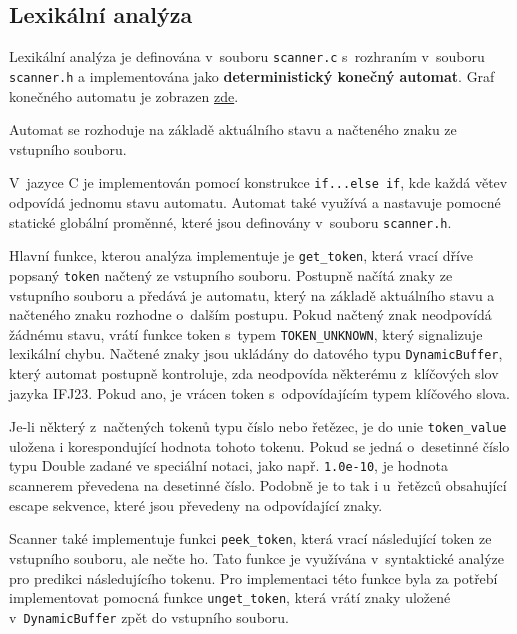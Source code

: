\documentclass[a4paper, 11pt]{article}
\begin{document}
	\subsection{Lexikální analýza} \label{sec:lex}
	Lexikální analýza je definována v~souboru \texttt{scanner.c} s~rozhraním v~souboru \texttt{scanner.h} a implementována jako \textbf{deterministický konečný automat}. Graf konečného automatu je zobrazen \hyperref[sec:fa]{zde}.
	\par\noindent Automat se rozhoduje na základě aktuálního stavu a načteného znaku ze vstupního souboru.
	\par\noindent V~jazyce C je implementován pomocí konstrukce \texttt{if...else if}, kde každá větev odpovídá jednomu stavu automatu. Automat také využívá a nastavuje pomocné statické globální proměnné, které jsou definovány v~souboru \texttt{scanner.h}. 
	\par\noindent Hlavní funkce, kterou analýza implementuje je \texttt{get\_token}, která vrací dříve popsaný \texttt{token} načtený ze vstupního souboru. Postupně načítá znaky ze vstupního souboru a předává je automatu, který na základě aktuálního stavu a načteného znaku rozhodne o~dalším postupu. Pokud načtený znak neodpovídá žádnému stavu, vrátí funkce token s~typem \texttt{TOKEN\_UNKNOWN}, který signalizuje lexikální chybu.
	Načtené znaky jsou ukládány do datového typu \texttt{DynamicBuffer}, který automat postupně kontroluje, zda neodpovída některému z~klíčových slov jazyka IFJ23. Pokud ano, je vrácen token s~odpovídajícím typem klíčového slova.
	\par\noindent Je-li některý z~načtených tokenů typu číslo nebo řetězec, je do unie \texttt{token\_value} uložena i korespondující hodnota tohoto tokenu. Pokud se jedná o~desetinné číslo typu Double zadané ve speciální notaci, jako např. \texttt{1.0e-10}, je hodnota scannerem převedena na desetinné číslo. Podobně je to tak i u~řetězců obsahující escape sekvence, které jsou převedeny na odpovídající znaky.
	\par\noindent Scanner také implementuje funkci \texttt{peek\_token}, která vrací následující token ze vstupního souboru, ale nečte ho. Tato funkce je využívána v~syntaktické analýze pro predikci následujícího tokenu. Pro implementaci této funkce byla za potřebí implementovat pomocná funkce \texttt{unget\_token}, která vrátí znaky uložené v~\texttt{DynamicBuffer} zpět do vstupního souboru.


	
\end{document}
